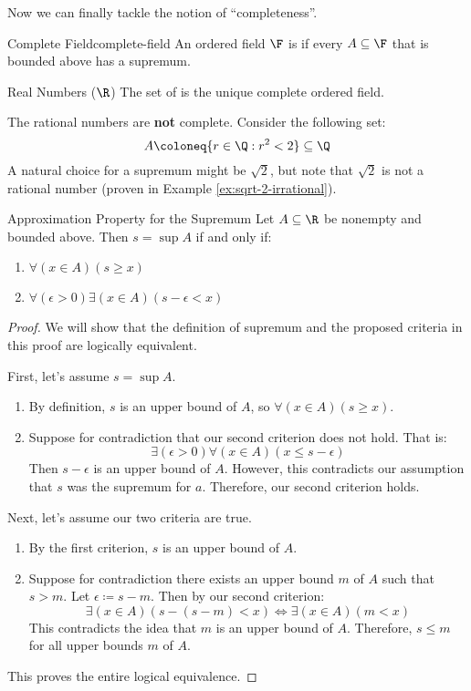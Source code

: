 \documentclass[letterpaper,12pt]{report}
\begin{document}
Now we can finally tackle the notion of ``completeness''.

\begin{dfnbox}{Complete Field}{complete-field}
	An ordered field $\F$ is  if every $A \subseteq \F$ that is bounded above has a supremum.
\end{dfnbox}

\begin{dfnbox}{Real Numbers ($\R$)}{}
	The set of  is the unique complete ordered field.
\end{dfnbox}

The rational numbers are \textbf{not} complete. Consider the following set:
\[ A \coloneq \{r \in \Q : r^2 < 2 \} \subseteq \Q \]
A natural choice for a supremum might be $\sqrt{2}$, but note that $\sqrt{2}$ is not a rational number (proven in Example \ref{ex:sqrt-2-irrational}).

\begin{thmbox}{Approximation Property for the Supremum}{}
	Let $A \subseteq \R$ be nonempty and bounded above. Then $s = \sup A$ if and only if:
	\begin{enumerate}
		\item $\forall (x \in A) (s \geq x)$
		\item $\forall (\epsilon > 0) \exists (x \in A) (s - \epsilon < x)$
	\end{enumerate}
	\tcblower
	\begin{proof}
		We will show that the definition of supremum and the proposed criteria in this proof are logically equivalent.

		First, let's assume $s = \sup A$.
		\begin{enumerate}
			\item By definition, $s$ is an upper bound of $A$, so $\forall (x \in A)(s \geq x)$.
			\item Suppose for contradiction that our second criterion does not hold. That is: $$\exists (\epsilon > 0) \forall (x \in A) (x \leq s - \epsilon)$$ Then $s-\epsilon$ is an upper bound of $A$. However, this contradicts our assumption that $s$ was the supremum for $a$. Therefore, our second criterion holds.
		\end{enumerate}

		Next, let's assume our two criteria are true.
		\begin{enumerate}
			\item By the first criterion, $s$ is an upper bound of $A$.
			\item Suppose for contradiction there exists an upper bound $m$ of $A$ such that $s > m$. Let $\epsilon \coloneq s - m$. Then by our second criterion: $$\exists (x \in A)(s - (s - m) < x) \iff \exists (x \in A)(m < x)$$ This contradicts the idea that $m$ is an upper bound of $A$. Therefore, $s \leq m$ for all upper bounds $m$ of $A$.
		\end{enumerate}
		This proves the entire logical equivalence.
	\end{proof}
\end{thmbox}
\end{document}
